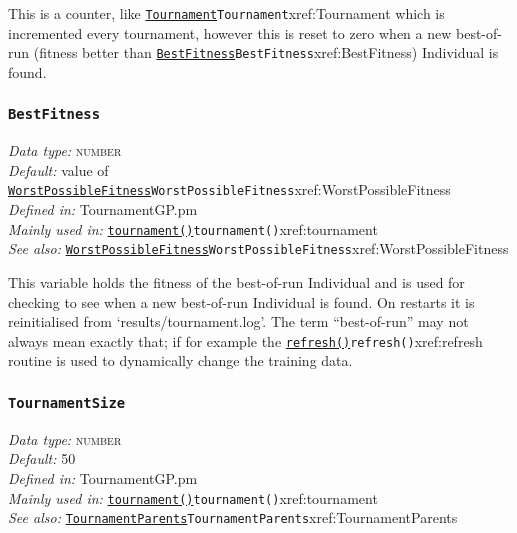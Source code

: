 \documentclass[a4paper]{article}
\begin{document}
This is a counter, like \hyperref[no]{\texttt{Tournament}}{\texttt{Tournament}}{xref:Tournament} which is incremented every
tournament, however this is reset to zero when a new best-of-run
(fitness better than \hyperref[no]{\texttt{BestFitness}}{\texttt{BestFitness}}{xref:BestFitness}) Individual is found.

\subsubsection{\texttt{BestFitness}}\label{xref:BestFitness}
\begin{flushleft}
\textit{Data type:} \textsc{number}\\
\textit{Default:} value of \hyperref[no]{\texttt{WorstPossibleFitness}}{\texttt{WorstPossibleFitness}}{xref:WorstPossibleFitness}\\
\textit{Defined in:} TournamentGP.pm\\
\textit{Mainly used in:} \hyperref[no]{\texttt{tournament()}}{\texttt{tournament()}}{xref:tournament}\\
\textit{See also:} \hyperref[no]{\texttt{WorstPossibleFitness}}{\texttt{WorstPossibleFitness}}{xref:WorstPossibleFitness}
\end{flushleft}

This variable holds the fitness of the best-of-run Individual and is
used for checking to see when a new best-of-run Individual is found.
On restarts it is reinitialised from `results/tournament.log'.  The
term ``best-of-run'' may not always mean exactly that; if for example
the \hyperref[no]{\texttt{refresh()}}{\texttt{refresh()}}{xref:refresh} routine is used to dynamically change the
training data.

\subsubsection{\texttt{TournamentSize}}\label{xref:TournamentSize}
\begin{flushleft}
\textit{Data type:} \textsc{number}\\
\textit{Default:} 50\\
\textit{Defined in:} TournamentGP.pm\\
\textit{Mainly used in:} \hyperref[no]{\texttt{tournament()}}{\texttt{tournament()}}{xref:tournament}\\
\textit{See also:} \hyperref[no]{\texttt{TournamentParents}}{\texttt{TournamentParents}}{xref:TournamentParents}
\end{flushleft}
\end{document}
